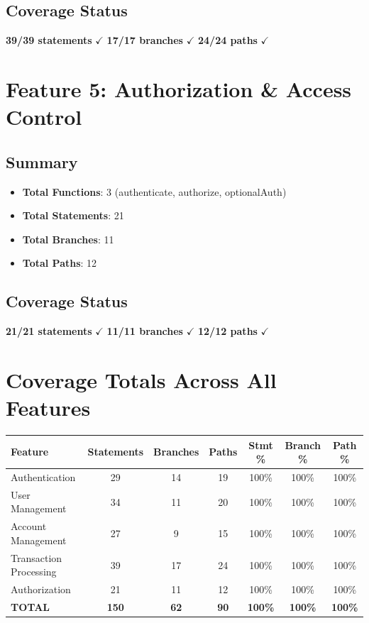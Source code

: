 \subsection{Coverage Status}
\begin{center}
\textbf{39/39 statements} $\checkmark$ \quad \textbf{17/17 branches} $\checkmark$ \quad \textbf{24/24 paths} $\checkmark$
\end{center}

\section{Feature 5: Authorization \& Access Control}

\subsection{Summary}
\begin{itemize}
    \item \textbf{Total Functions}: 3 (authenticate, authorize, optionalAuth)
    \item \textbf{Total Statements}: 21
    \item \textbf{Total Branches}: 11
    \item \textbf{Total Paths}: 12
\end{itemize}

\subsection{Coverage Status}
\begin{center}
\textbf{21/21 statements} $\checkmark$ \quad \textbf{11/11 branches} $\checkmark$ \quad \textbf{12/12 paths} $\checkmark$
\end{center}

\section{Coverage Totals Across All Features}

\begin{longtable}{|l|c|c|c|c|c|c|}
\hline
\textbf{Feature} & \textbf{Statements} & \textbf{Branches} & \textbf{Paths} & \textbf{Stmt \%} & \textbf{Branch \%} & \textbf{Path \%} \\
\hline
Authentication & 29 & 14 & 19 & 100\% & 100\% & 100\% \\
\hline
User Management & 34 & 11 & 20 & 100\% & 100\% & 100\% \\
\hline
Account Management & 27 & 9 & 15 & 100\% & 100\% & 100\% \\
\hline
Transaction Processing & 39 & 17 & 24 & 100\% & 100\% & 100\% \\
\hline
Authorization & 21 & 11 & 12 & 100\% & 100\% & 100\% \\
\hline
\textbf{TOTAL} & \textbf{150} & \textbf{62} & \textbf{90} & \textbf{100\%} & \textbf{100\%} & \textbf{100\%} \\
\hline
\end{longtable}

